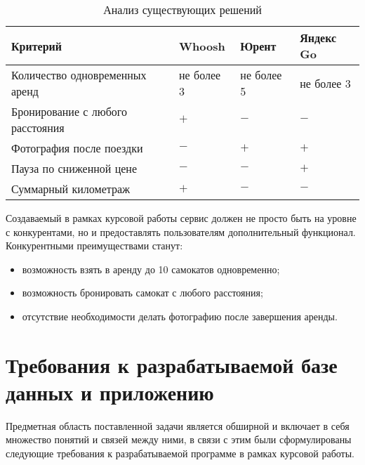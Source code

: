 \begin{table}[H]
    \caption{Анализ существующих решений}
    \label{tbl:comparison}
    {\renewcommand{\arraystretch}{1.2}
    \begin{tabularx}{\textwidth} 
        {
            | >{\raggedright\arraybackslash}X 
            | >{\centering\arraybackslash}X 
            | >{\centering\arraybackslash}X 
            | >{\centering\arraybackslash}X |
        }
        \hline
        \textbf{Критерий} & \textbf{Whoosh} & \textbf{Юрент} & \textbf{Яндекс Go}\\
        \hline
        Количество одновременных аренд & не более 3 & не более 5 & не более 3\\
        \hline
        Бронирование с любого расстояния & $+$ & $-$ & $-$\\
        \hline
        Фотография после поездки & $-$ & $+$ & $+$\\
        \hline
        Пауза по сниженной цене & $-$ & $-$ & $+$\\
        \hline
        Суммарный километраж & $+$ & $-$ & $-$\\
        \hline
    \end{tabularx}}
\end{table}

Создаваемый в рамках курсовой работы сервис должен не просто быть на уровне с конкурентами, но и предоставлять пользователям дополнительный функционал. Конкурентными преимуществами станут:

\begin{itemize}
    \item возможность взять в аренду до 10 самокатов одновременно;
    \item возможность бронировать самокат с любого расстояния;
    \item отсутствие необходимости делать фотографию после завершения аренды.
\end{itemize}

\section{Требования к разрабатываемой базе данных и приложению}

Предметная область поставленной задачи является обширной и включает в себя множество понятий и связей между ними, в связи с этим были сформулированы следующие требования к разрабатываемой программе в рамках курсовой работы.

